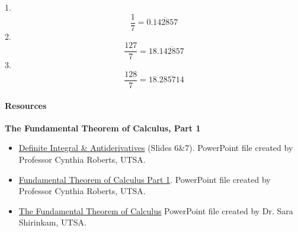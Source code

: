 1. $$\frac17=0.\overline{142857}$$
2. $$\frac{127}{7}=18.\overline{142857}$$
3. $$\frac{128}{7}=18.\overline{285714}$$

\paragraph{Resources}

\textbf{The Fundamental Theorem of Calculus, Part 1}

\begin{itemize}
    \item \href{https://mathresearch.utsa.edu/wikiFiles/MAT1193/The\%20Fundamental\%20Theorem\%20of\%20Calculus/Presentation12_DefiniteIntegral\%20\&\%20Antiderivatives.pptx}{Definite Integral \& Antiderivatives} (Slides 6\&7). PowerPoint file created by Professor Cynthia Roberts, UTSA.
    \item \href{https://mathresearch.utsa.edu/wikiFiles/MAT1193/The\%20Fundamental\%20Theorem\%20of\%20Calculus/Presentation13_FTC\%20Part\%20I.pptx}{Fundamental Theorem of Calculus Part 1}. PowerPoint file created by Professor Cynthia Roberts, UTSA.
    \item \href{https://mathresearch.utsa.edu/wikiFiles/MAT1214/The\%20Fundamental\%20Theorem\%20of\%20Calculus_/MAT1214-TheFundamentalTheoremPwPt.pptx}{The Fundamental Theorem of Calculus} PowerPoint file created by Dr. Sara Shirinkam, UTSA.
\end{itemize}

